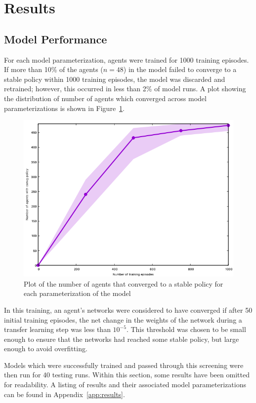 \section{Results}
\label{sec:farm_results}

\subsection{Model Performance}
\label{subsec:farm_results_robust}

For each model parameterization,
agents were trained for 1000 training episodes.
If more than 10\%  of the agents ($n=48$) in the model failed to converge
to a stable policy within 1000 training episodes, the model was discarded 
and retrained; however, this occurred in less than 2\% of model runs.
A plot showing the distribution of number of agents which converged
across model parameterizations is shown in Figure~\ref{fig:farm_sfc}.

\begin{figure}
\centering
\includegraphics[width=.4\textwidth]{figure/sfc}
\caption{Plot of the number of agents that converged to a stable policy
    for each parameterization of the model}
\label{fig:farm_sfc}
\end{figure}

In this training,
an agent's networks were considered to have converged if after 50
initial training episodes, 
the net change in the weights of the network during a transfer learning step
was less than $10^{-5}$.
This threshold was chosen to be small enough to ensure that the networks
had reached some stable policy, but large enough to avoid overfitting.

Models which were successfully trained and passed through this screening
were then run for 40 testing runs.
Within this section,
some results have been omitted for readability.
A listing of results and their associated model parameterizations can be found in
Appendix~\ref{app:results}.

